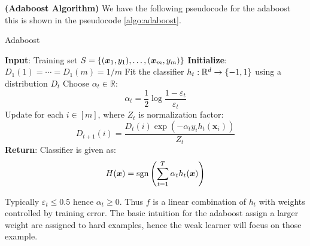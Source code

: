 \begin{definition}{\textbf{(Adaboost Algorithm)}}
    We have the following pseudocode for the adaboost this is shown in the pseudocode \ref{algo:adaboost}.
    \begin{algorithm}[H]
        \caption{Adaboost}
        \label{algo:adaboost}
        \begin{algorithmic}[1]
            \State \textbf{Input}: Training set $S = \left\{ (\boldsymbol x_1,y_1),\dots,(\boldsymbol x_m, y_m) \right\}$
            \State \textbf{Initialize}: $D_1(1)=\cdots=D_1(m)=1/m$
                \State Fit the classifier $h_t : \mathbb{R}^d\rightarrow\left\{ -1, 1 \right\}$ using a distribution $D_t$
                \State Choose $\alpha_t \in \mathbb{R}$:
                \begin{equation*}
                    \alpha_t = \frac{1}{2}\log\frac{1-\varepsilon_t}{\varepsilon_t}
                \end{equation*}
                \State Update for each $i \in [m]$, where $Z_t$ is normalization factor:
                \begin{equation*}
                    D_{t+1}(i) = \frac{D_t(i)\exp(-\alpha_ty_ih_t(\boldsymbol x_i))}{Z_t}
                \end{equation*}
            \EndFor
            \State \textbf{Return}: Classifier is given as:
            \begin{equation*}
                H(\boldsymbol x) = \operatorname{sgn}\left( \sum^T_{t=1}\alpha_th_t(\boldsymbol x) \right)
            \end{equation*}
        \end{algorithmic} 
    \end{algorithm}
    Typically $\varepsilon_t \le 0.5$ hence $\alpha_t \ge 0$. Thus $f$ is a linear combination of $h_t$ with weights controlled by training error. The basic intuition for the adaboost assign a larger weight are assigned to hard examples, hence the weak learner will focus on those example. 
\end{definition}

